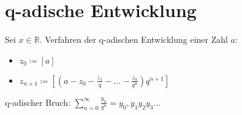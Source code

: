 \section{q-adische Entwicklung}
Sei $x \in \mathbb{R}$. Verfahren der q-adischen Entwicklung einer Zahl $a$:
\begin{itemize}
    \item $z_0 \coloneqq [a]$
    \item $z_{n+1} \coloneqq [(a - z_0 - \frac{z_1}{q} - \ldots - \frac{z_n}{q^n}) q^{n+1}]$
\end{itemize}
q-adischer Bruch: $\sum \limits_{n=0}^{\infty} \frac{y_n}{q^n} = y_0,y_1y_2y_3\ldots$